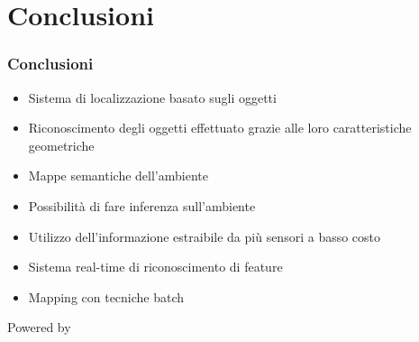 \documentclass[c]{beamer}
\begin{document}
\section{Conclusioni}
\begin{frame}
\frametitle{Conclusioni}
\begin{itemize}
 \item Sistema di localizzazione basato sugli oggetti
 \item Riconoscimento degli oggetti effettuato grazie alle loro caratteristiche geometriche
 \item Mappe semantiche dell'ambiente
 \item Possibilità di fare inferenza sull'ambiente
 \item Utilizzo dell'informazione estraibile da più sensori a basso costo
 \item Sistema real-time di riconoscimento di feature
 \item Mapping con tecniche batch
\end{itemize}


\end{frame}


\begin{frame}

\paperheight

  \vskip 3cm
  \begin{flushright}
     \footnotesize Powered by \selectfont{\LaTeX}
  \end{flushright}
\end{frame}
\end{document}
